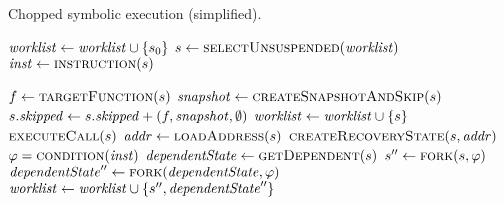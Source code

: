 
\begin{algorithm} %
\caption{Chopped symbolic execution (simplified).\label{fig:chopped-symbexe-recover}\label{fig:chopped-symbexe} }
\begin{algorithmic}[1]
  \State $\mathit{worklist} \gets \mathit{worklist} \cup \{ s_0\}$  \label{alg:seed-worklist}
  \While{$\worklist \neq \emptyset$}                     \label{alg:iterate-worklist}
    \State $\workstate \gets  \Call{selectUnsuspended}{\worklist}$ \label{alg:pop-worklist}
    \State $\inst \gets  \Call{instruction}{\workstate}$ \label{alg:get-switch-inst}

    \Switch{$\inst$} \label{alg:switch}
     \label{alg:casecall-begin}
      \State $f \gets  \Call{targetFunction}{\workstate}$ \label{alg:call-find-target}
        \State $\snapshot \gets \Call{createSnapshotAndSkip}{\workstate}$ \label{alg:take-snapshot}
        \State $s.\mathit{skipped} \gets s.\mathit{skipped} + (f,\mathit{snapshot},\emptyset)$ \label{alg:record-snapshot}
        \State $\mathit{worklist}  \gets  \mathit{worklist}  \cup \{s\}$ \label{alg:push-worklist-call}
      \Else
        \State $\Call{executeCall}{\workstate}$ \label{alg:call-normal}
      \EndIf
    \EndCase \label{alg:casecall-end}
     \label{alg:caseload-begin}
      \State $\addr \gets \Call{loadAddress}{\workstate}$
        \State $\Call{createRecoveryState}{\workstate,\addr}$ \label{alg:call-recover}
      \Else
      \State {}  \label{alg:load-normal}
      \EndIf
    \EndCase \label{alg:caseload-end}
     \label{alg:casebranch-begin}
       \label{alg:branch-check-recovery}
        \State $\varphi = \Call{condition}{\inst}$  \label{alg:branch-get-cond}
        \State $\dependentState \gets  \Call{getDependent}{\workstate}$ \label{alg:extract-dependent}
        \State $\workstate'' \gets \Call{fork}{\workstate,\varphi }$ \label{alg:branch-fork-true1}
        \State $\dependentState'' \gets \Call{fork}{\dependentState,\varphi }$ \label{alg:branch-fork-true2}
       \label{alg:branch-feasible-true}
           \State $\mathit{worklist}  \gets  \mathit{worklist}  \cup \{s'', \mathit{dependentState}''\}$

\end{algorithmic}
\end{algorithm}

